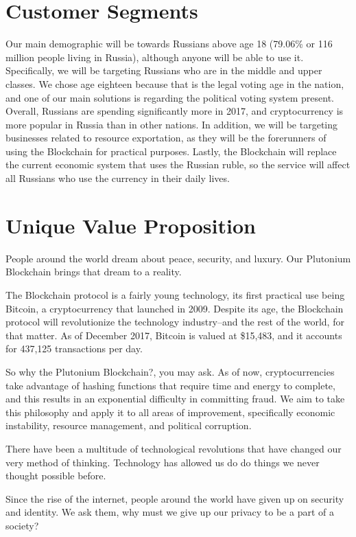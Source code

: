 \documentclass[12pt]{article}
\begin{document}
\section{Customer Segments}
Our main demographic will be towards Russians above age 18 (79.06\% or 116 million people living in Russia), although anyone will be able to use it. Specifically, we will be targeting Russians who are in the middle and upper classes. We chose age eighteen because that is the legal voting age in the nation, and one of our main solutions is regarding the political voting system present. Overall, Russians are spending significantly more in 2017, and cryptocurrency is more popular in Russia than in other nations. In addition, we will be targeting businesses related to resource exportation, as they will be the forerunners of using the Blockchain for practical purposes. Lastly, the Blockchain will replace the current economic system that uses the Russian ruble, so the service will affect all Russians who use the currency in their daily lives.
\pagebreak
\section{Unique Value Proposition}
People around the world dream about peace, security, and luxury. Our Plutonium Blockchain brings that dream to a reality.

The Blockchain protocol is a fairly young technology, its first practical use being Bitcoin, a cryptocurrency that launched in 2009. Despite its age, the Blockchain protocol will revolutionize the technology industry--and the rest of the world, for that matter. As of December 2017, Bitcoin is valued at \$15,483, and it accounts for 437,125 transactions per day.

So why the Plutonium Blockchain?, you may ask. As of now, cryptocurrencies take advantage of hashing functions that require time and energy to complete, and this results in an exponential difficulty in committing fraud. We aim to take this philosophy and apply it to all areas of improvement, specifically economic instability, resource management, and political corruption.

There have been a multitude of technological revolutions that have changed our very method of thinking. Technology has allowed us do do things we never thought possible before. 

Since the rise of the internet, people around the world have given up on security and identity. We ask them, why must we give up our privacy to be a part of a society?
\pagebreak
\end{document}
